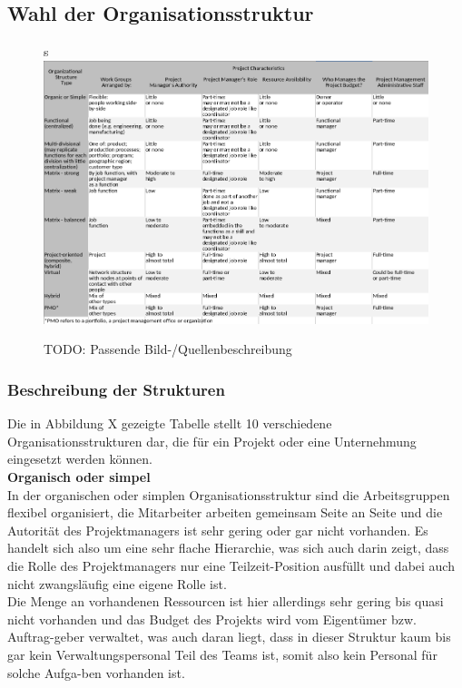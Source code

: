 \documentclass[ThesisDJ.tex]{subfiles}
\begin{document}
  \subsection{Wahl der Organisationsstruktur}

\begin{figure}[ht]
    \hspace{-2cm}s
    \includegraphics[width=40pc]{./Organisationsstrukturen.png}
    \caption{TODO: Passende Bild-/Quellenbeschreibung}
\end{figure} 

\subsubsection{Beschreibung der Strukturen}

Die in Abbildung X gezeigte Tabelle stellt 10 verschiedene Organisationsstrukturen dar, die für ein Projekt oder eine Unternehmung eingesetzt werden können. \smallskip\\

\textbf{Organisch oder simpel}\\
In der organischen oder simplen Organisationsstruktur sind die Arbeitsgruppen flexibel organisiert, die Mitarbeiter arbeiten gemeinsam Seite an Seite und die Autorität des Projektmanagers ist sehr gering oder gar nicht vorhanden. Es handelt sich also um eine sehr flache Hierarchie, was sich auch darin zeigt, dass die Rolle des Projektmanagers nur eine Teilzeit-Position ausfüllt und dabei auch nicht zwangsläufig eine eigene Rolle ist.\\
Die Menge an vorhandenen Ressourcen ist hier allerdings sehr gering bis quasi nicht vorhanden und das Budget des Projekts wird vom Eigentümer bzw. Auftrag-geber verwaltet, was auch daran liegt, dass in dieser Struktur kaum bis gar kein Verwaltungspersonal Teil des Teams ist, somit also kein Personal für solche Aufga-ben vorhanden ist. \medskip\\
\end{document}
